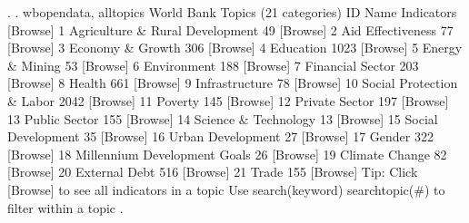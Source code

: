 . 
. wbopendata, alltopics
{\smallskip}
World Bank Topics (21 categories)
  ID  Name                                         Indicators  [Browse]
   1  Agriculture \& Rural Development                      49  [Browse]
   2  Aid Effectiveness                                    77  [Browse]
   3  Economy \& Growth                                    306  [Browse]
   4  Education                                          1023  [Browse]
   5  Energy \& Mining                                      53  [Browse]
   6  Environment                                         188  [Browse]
   7  Financial Sector                                    203  [Browse]
   8  Health                                              661  [Browse]
   9  Infrastructure                                       78  [Browse]
  10  Social Protection \& Labor                          2042  [Browse]
  11  Poverty                                             145  [Browse]
  12  Private Sector                                      197  [Browse]
  13  Public Sector                                       155  [Browse]
  14  Science \& Technology                                 13  [Browse]
  15  Social Development                                   35  [Browse]
  16  Urban Development                                    27  [Browse]
  17  Gender                                              322  [Browse]
  18  Millennium Development Goals                         26  [Browse]
  19  Climate Change                                       82  [Browse]
  20  External Debt                                       516  [Browse]
  21  Trade                                               155  [Browse]
{\smallskip}
Tip: Click [Browse] to see all indicators in a topic
     Use search(keyword) searchtopic(\#) to filter within a topic
{\smallskip}
. 
